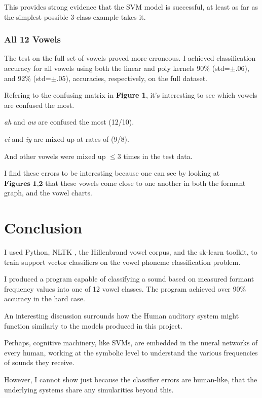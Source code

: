 \documentclass[twoside]{article}
\begin{document}
\begin{multicols}{2}
This provides strong evidence that the SVM model is successful, at least as far as the simplest possible 3-class example takes it.

\subsubsection{All 12 Vowels}

The test on the full set of vowels proved more erroneous. I achieved classification accuracy for all vowels using both the linear and poly kernels 90\% (std=$\pm.06$), and 92\% (std=$\pm.05$), accuracies, respectively, on the full dataset.

Refering to the confusing matrix in \textbf{Figure 1}, it's interesting to see which vowels are confused the most.

\textit{ah} and \textit{aw} are confused the most (12/10).

\textit{ei} and \textit{iy} are mixed up at rates of (9/8).

And other vowels were mixed up $\leq3$ times in the test data.

I find these errors to be interesting because one can see by looking at $\textbf{Figures 1,2}$ that these vowels come close to one another in both the formant graph, and the vowel charts.

\section{Conclusion}

I used Python, NLTK \cite{nltk}, the Hillenbrand vowel corpus, and the sk-learn toolkit, to train support vector classifiers on the vowel phoneme classification problem.

I produced a program capable of classifying a sound based on measured formant frequency values into one of 12 vowel classes.  The program achieved over 90\% accuracy in the hard case.

An interesting discussion surrounds how the Human auditory system might function similarly to the models produced in this project.

Perhaps, cognitive machinery, like SVMs, are embedded in the nueral networks of every human, working at the symbolic level to understand the various frequencies of sounds they receive.

However, I cannot show just because the classifier errors are human-like, that the underlying systems share any simularities beyond this.


\end{multicols}
\end{document}
